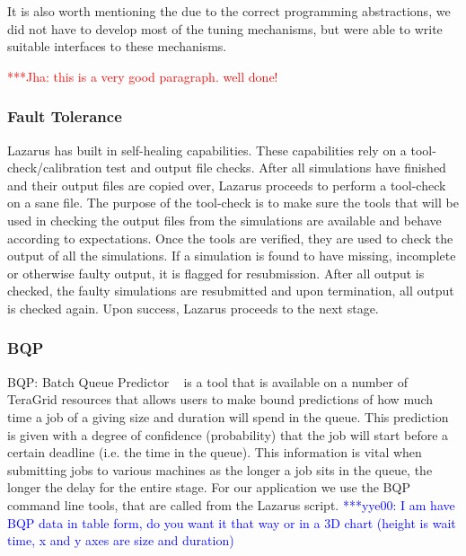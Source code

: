 \documentclass[conference,final]{IEEEtran}
\newcommand{\jhanote}[1]{ {\textcolor{red} { ***Jha: #1 }}}
\newcommand{\yyenote}[1]{ {\textcolor{blue} { ***yye00: #1 }}}
\begin{document}
It is also worth mentioning the due to the correct programming
abstractions, we did not have to develop most of the tuning
mechanisms, but were able to write suitable interfaces to these
mechanisms.

\jhanote{this is a very good paragraph. well done!}


\subsubsection{Fault Tolerance}
Lazarus has built in self-healing capabilities. These capabilities
rely on a tool-check/calibration test and output file checks. After
all simulations have finished and their output files are copied over,
Lazarus proceeds to perform a tool-check on a sane file. The purpose
of the tool-check is to make sure the tools that will be used in
checking the output files from the simulations are available and
behave according to expectations. Once the tools are verified, they
are used to check the output of all the simulations. If a simulation
is found to have missing, incomplete or otherwise faulty output, it is
flagged for resubmission.  After all output is checked, the faulty
simulations are resubmitted and upon termination, all output is
checked again. Upon success, Lazarus proceeds to the next stage.


\subsubsection{BQP}
BQP: Batch Queue Predictor ~\cite{bqp} is a tool that is available on
a number of TeraGrid resources that allows users to make bound
predictions of how much time a job of a giving size and duration will
spend in the queue.  This prediction is given with a degree of
confidence (probability) that the job will start before a certain
deadline (i.e. the time in the queue).  This information is vital when
submitting jobs to various machines as the longer a job sits in the
queue, the longer the delay for the entire stage.  For our application
we use the BQP command line tools, that are called from the Lazarus
script.  \yyenote{I am have BQP data in table form, do you want it
  that way or in a 3D chart (height is wait time, x and y axes are
  size and duration)}
\end{document}

